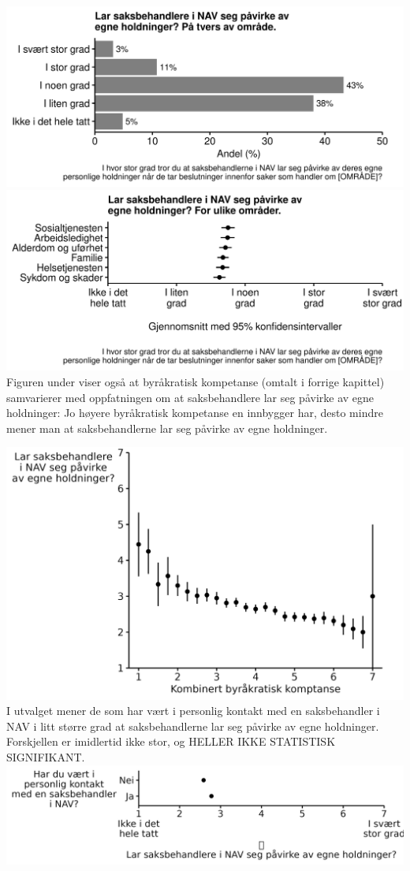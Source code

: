 \documentclass[
]{book}
\begin{document}
\includegraphics{figs/png/fig_nav_exp_attinfluence_all.png}
\includegraphics{figs/png/fig_nav_exp_attinfluence_area.png}
Figuren under viser også at byråkratisk kompetanse (omtalt i forrige kapittel) samvarierer med oppfatningen om at saksbehandlere lar seg påvirke av egne holdninger:
Jo høyere byråkratisk kompetanse en innbygger har, desto mindre mener man at saksbehandlerne lar seg påvirke av egne holdninger.

\includegraphics{figs/png/fig_attinfluence_by_be.png}
I utvalget mener de som har vært i personlig kontakt med en saksbehandler i NAV i litt større grad at saksbehandlerne lar seg påvirke av egne holdninger.
Forskjellen er imidlertid ikke stor, og HELLER IKKE STATISTISK SIGNIFIKANT.
\includegraphics{figs/png/fig_attinfluence_by_contact.png}
\end{document}
